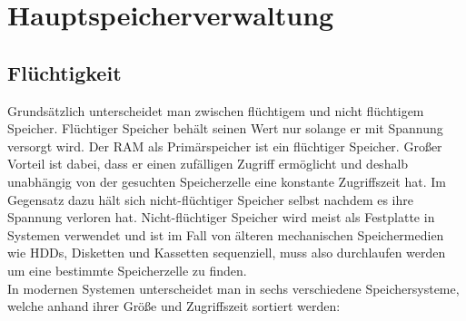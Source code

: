 \documentclass{article}
\begin{document}
	 \section{Hauptspeicherverwaltung}
	 \subsection{Flüchtigkeit}
	 Grundsätzlich unterscheidet man zwischen flüchtigem und nicht flüchtigem Speicher. Flüchtiger Speicher behält seinen Wert nur solange er mit Spannung versorgt wird. Der RAM als Primärspeicher ist ein flüchtiger Speicher. Großer Vorteil ist dabei, dass er einen zufälligen Zugriff ermöglicht und deshalb unabhängig von der gesuchten Speicherzelle eine konstante Zugriffszeit hat. Im Gegensatz dazu hält sich nicht-flüchtiger Speicher selbst nachdem es ihre Spannung verloren hat. Nicht-flüchtiger Speicher wird meist als Festplatte in Systemen verwendet und ist im Fall von älteren mechanischen Speichermedien wie HDDs, Disketten und Kassetten sequenziell, muss also durchlaufen werden um eine bestimmte Speicherzelle zu finden. \\
	 In modernen Systemen unterscheidet man in sechs verschiedene Speichersysteme, welche anhand ihrer Größe und Zugriffszeit sortiert werden:
\end{document}
